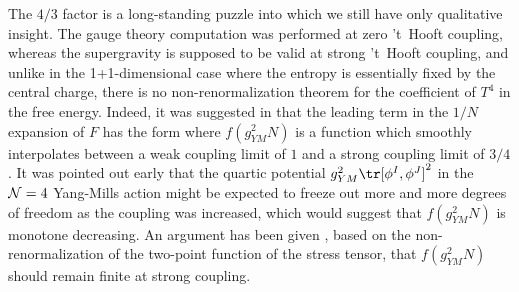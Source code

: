 The $4/3$ factor  is a long-standing puzzle into which we still have
only qualitative insight.  The gauge theory computation was performed
at zero 't~Hooft coupling, whereas the supergravity is supposed to be
valid at strong 't~Hooft coupling, and unlike in the 1+1-dimensional
case where the entropy is essentially fixed by the central charge,
there is no non-renormalization theorem for the coefficient of $T^4$ in the
free energy.  Indeed, it was suggested in \cite{Gubser:1998nz} that
the leading term in the $1/N$ expansion of $F$ has the form
 where $f(g_{YM}^2 N)$ is a function which smoothly interpolates between a
weak coupling limit of $1$ and a strong coupling limit of $3/4$.  It was
pointed out early \cite{Horowitz:1997nw} that the quartic potential
$g_{YM}^2 \tr [\phi^I,\phi^J]^2$ in the ${\cal N}=4$ Yang-Mills action
might be expected to freeze out more and more degrees of freedom as the
coupling was increased, which would suggest that $f(g_{YM}^2 N)$ is
monotone decreasing.  An argument has been given \cite{Itzhaki:1999ge},
based on the non-renormalization of the two-point function of the stress
tensor, that $f(g_{YM}^2 N)$ should remain finite at strong coupling.

